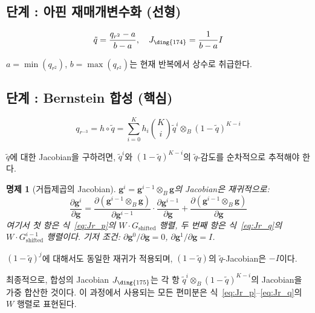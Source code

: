 \documentclass[11pt]{article}
\newtheorem{proposition}{명제}
\begin{document}
\subsection{단계 : 아핀 재매개변수화 (선형)}

\begin{equation}
  \tilde{q} = \frac{q_{r^2} - a}{b - a}, \quad
  J_{\ding{174}} = \frac{1}{b-a} I
  \label{eq:J3}
\end{equation}

$a = \min(q_{r^2})$, $b = \max(q_{r^2})$는 현재 반복에서 상수로 취급한다.

\subsection{단계 : Bernstein 합성 (핵심)}

\begin{equation}
  q_{r^{-3}} = h \circ \tilde{q}
  = \sum_{i=0}^K h_i \binom{K}{i}
    \tilde{q}^i \otimes_B (1-\tilde{q})^{K-i}
\end{equation}

$\tilde{q}$에 대한 Jacobian을 구하려면, $\tilde{q}^i$와 $(1-\tilde{q})^{K-i}$의
$\tilde{q}$-감도를 순차적으로 추적해야 한다.

\begin{proposition}[거듭제곱의 Jacobian]
$\mathbf{g}^i = \mathbf{g}^{i-1} \otimes_B \mathbf{g}$의 Jacobian은 재귀적으로:
\begin{equation}
  \frac{\partial \mathbf{g}^i}{\partial \mathbf{g}}
  = \frac{\partial (\mathbf{g}^{i-1} \otimes_B \mathbf{g})}{\partial \mathbf{g}^{i-1}}
    \cdot \frac{\partial \mathbf{g}^{i-1}}{\partial \mathbf{g}}
  + \frac{\partial (\mathbf{g}^{i-1} \otimes_B \mathbf{g})}{\partial \mathbf{g}}
  \label{eq:power_jac}
\end{equation}
여기서 첫 항은 식~\eqref{eq:Jr_p}의 $W \cdot G_{\mathrm{shifted}}$ 행렬,
두 번째 항은 식~\eqref{eq:Jr_q}의 $W \cdot G^{i-1}_{\mathrm{shifted}}$ 행렬이다.
기저 조건: $\partial \mathbf{g}^0 / \partial \mathbf{g} = 0$,
$\partial \mathbf{g}^1 / \partial \mathbf{g} = I$.
\end{proposition}

$(1-\tilde{q})^j$에 대해서도 동일한 재귀가 적용되며,
$(1-\tilde{q})$의 $\tilde{q}$-Jacobian은 $-I$이다.

최종적으로, 합성의 Jacobian $J_{\ding{175}}$는 각 항
$\tilde{q}^i \otimes_B (1-\tilde{q})^{K-i}$의 Jacobian을
가중 합산한 것이다. 이 과정에서 사용되는 모든 편미분은
식~\eqref{eq:Jr_p}--\eqref{eq:Jr_q}의 $W$ 행렬로 표현된다.
\end{document}
